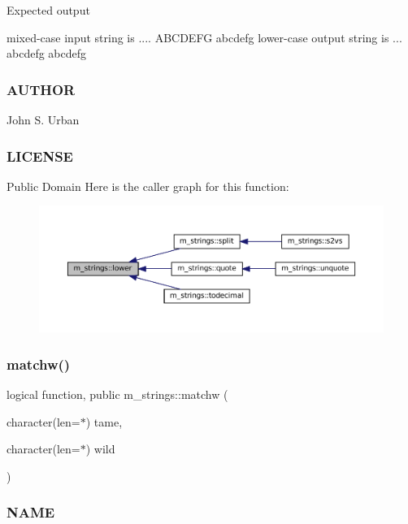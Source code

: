 Expected output \begin{DoxyVerb}mixed-case input string is .... ABCDEFG abcdefg
lower-case output string is ... abcdefg abcdefg
\end{DoxyVerb}
 \subsubsection*{A\+U\+T\+H\+OR}

John S. Urban \subsubsection*{L\+I\+C\+E\+N\+SE}

Public Domain Here is the caller graph for this function\+:\nopagebreak
\begin{figure}[H]
\begin{center}
\leavevmode
\includegraphics[width=350pt]{namespacem__strings_a3c7d4be9051206e4b2f72112f9fdc3b4_icgraph}
\end{center}
\end{figure}
\mbox{\label{namespacem__strings_a5f96f66162f0f04d58b4f5dced8e82c6}} 
\subsubsection{\texorpdfstring{matchw()}{matchw()}}
{\footnotesize\ttfamily logical function, public m\+\_\+strings\+::matchw (\begin{DoxyParamCaption}\item[{character(len=$\ast$)}]{tame,  }\item[{character(len=$\ast$)}]{wild }\end{DoxyParamCaption})}



\subsubsection*{N\+A\+ME}

